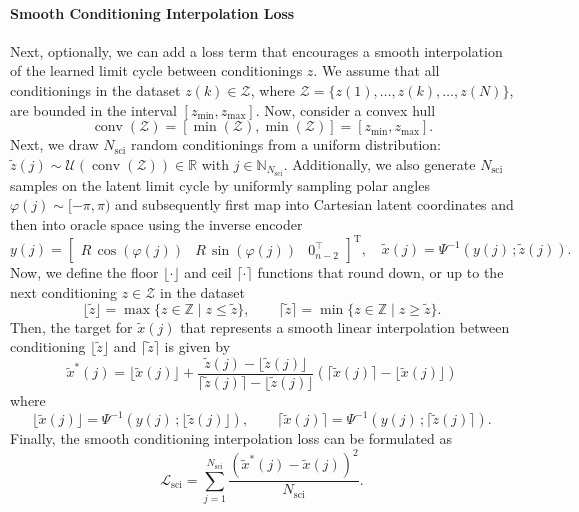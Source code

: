 \paragraph{Smooth Conditioning Interpolation Loss}
Next, optionally, we can add a loss term that encourages a smooth interpolation of the learned limit cycle between conditionings $z$. We assume that all conditionings in the dataset $z(k) \in \mathcal{Z}$, where $\mathcal{Z} = \{ z(1), \dots, z(k), \dots, z(N) \}$, are bounded in the interval $[z_\mathrm{min}, z_\mathrm{max}]$.
Now, consider a convex hull
\begin{equation*}
    \operatorname{conv}(\mathcal{Z}) = [\min(\mathcal{Z}), \min(\mathcal{Z})] = [z_\mathrm{min}, z_\mathrm{max}].
\end{equation*}
Next, we draw $N_\mathrm{sci}$ random conditionings from a uniform distribution: $\tilde{z}(j) \sim \mathcal{U}(\operatorname{conv}(\mathcal{Z})) \in \mathbb{R}$ with $j \in \mathbb{N}_{N_\mathrm{sci}}$.
Additionally, we also generate $N_\mathrm{sci}$ samples on the latent limit cycle by uniformly sampling polar angles $\varphi(j) \sim [-\pi, \pi)$ and subsequently first map into Cartesian latent coordinates and then into oracle space using the inverse encoder
\begin{equation}
    y(j) = \begin{bmatrix}
        R \, \cos(\varphi(j)) & R \, \sin(\varphi(j)) & 0_{n-2}^\top
    \end{bmatrix}^\mathrm{T},
    \quad
    \tilde{x}(j) = \Psi^{-1}(y(j) \, ; \tilde{z}(j)).
\end{equation}
Now, we define the floor $\lfloor \cdot \rfloor$ and ceil $\lceil \cdot \rceil$ functions that round down, or up to the next conditioning $z \in \mathcal{Z}$ in the dataset
\begin{equation}
    \lfloor \tilde{z} \rfloor = \max\{ z \in \mathbb{Z} \mid z \le \tilde{z} \},
    \qquad
    \lceil \tilde{z} \rceil = \min\{ z \in \mathbb{Z} \mid z \ge \tilde{z} \}.
\end{equation}
Then, the target for $\tilde{x}(j)$ that represents a smooth linear interpolation between conditioning $\lfloor \tilde{z} \rfloor $ and $\lceil \tilde{z} \rceil$ is given by
\begin{equation}
    \tilde{x}^*(j) = \lfloor \tilde{x}(j) \rfloor + \frac{\tilde{z}(j) - \lfloor \tilde{z}(j) \rfloor}{\lceil \tilde{z}(j) \rceil - \lfloor \tilde{z}(j) \rfloor} \left ( \lceil \tilde{x}(j) \rceil - \lfloor \tilde{x}(j) \rfloor \right )
\end{equation}
where
\begin{equation}
    \lfloor \tilde{x}(j) \rfloor = \Psi^{-1}(y(j) \, ; \lfloor \tilde{z}(j) \rfloor),
    \qquad
    \lceil \tilde{x}(j) \rceil = \Psi^{-1}(y(j) \, ; \lceil \tilde{z}(j) \rceil).
\end{equation}
Finally, the smooth conditioning interpolation loss can be formulated as
\begin{equation}
    \mathcal{L}_{\mathrm{sci}} = \sum_{j = 1}^{N_\mathrm{sci}} \frac{\left ( \tilde{x}^*(j) - \tilde{x}(j)\right )^2}{N_\mathrm{sci}}.
\end{equation}

